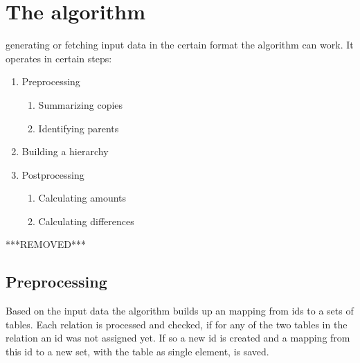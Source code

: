 \documentclass[10pt, journal, twocolumn]{IEEEtran}
\begin{document}
\section{The algorithm}
 generating or fetching input data in the certain format the algorithm can work. It operates in certain steps: \begin{enumerate}
\item Preprocessing
\begin{enumerate}
\item Summarizing copies
\item Identifying parents
\end{enumerate}
\item Building a hierarchy
\item Postprocessing
\begin{enumerate}
\item Calculating amounts 
\item Calculating differences
\end{enumerate}
\end{enumerate}
***REMOVED***
\subsection{Preprocessing}
Based on the input data the algorithm builds up an mapping from ids to a sets of tables. Each relation is processed and checked, if for any of the two tables in the relation an id was not assigned yet. If so a new id is created and a mapping from this id to a new set, with the table as single element, is saved. \\
\end{document}
